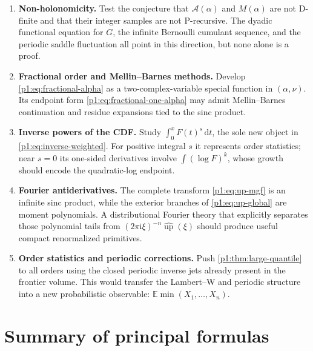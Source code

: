 \documentclass[11pt,oneside]{article}
\theoremstyle{definition}
\theoremstyle{remark}
\newcommand{\Up}{\operatorname{up}}
\newcommand{\E}{\mathbb E}
\newcommand{\dd}{\,\mathrm d}
\newcommand{\ii}{\mathrm i}
\newcommand{\1}{\mathbf 1}
\begin{document}
\begin{enumerate}
\item \textbf{Non-holonomicity.}  Test the conjecture that
\(\mathcal A(\alpha)\) and \(M(\alpha)\) are not D-finite and that their
integer samples are not P-recursive.  The dyadic functional equation for
\(G\), the infinite Bernoulli cumulant sequence, and the periodic saddle
fluctuation all point in this direction, but none alone is a proof.

\item \textbf{Fractional order and Mellin--Barnes methods.}  Develop
\eqref{p1:eq:fractional-alpha} as a two-complex-variable special function in
\((\alpha,\nu)\).  Its endpoint form \eqref{p1:eq:fractional-one-alpha} may admit
Mellin--Barnes continuation and residue expansions tied to the sinc product.

\item \textbf{Inverse powers of the CDF.}  Study
\(\int_0^xF(t)^s\dd t\), the sole new object in
\eqref{p1:eq:inverse-weighted}.  For positive integral \(s\) it represents order
statistics; near \(s=0\) its one-sided derivatives involve
\(\int(\log F)^k\), whose growth should encode the quadratic-log endpoint.

\item \textbf{Fourier antiderivatives.}  The complete transform
\eqref{p1:eq:up-mgf} is an infinite sinc product, while the exterior branches of
\eqref{p1:eq:up-global} are moment polynomials.  A distributional Fourier theory
that explicitly separates those polynomial tails from
\((2\pi\ii\xi)^{-n}\widehat{\Up}(\xi)\) should produce useful compact
renormalized primitives.

\item \textbf{Order statistics and periodic corrections.}  Push
\cref{p1:thm:large-quantile} to all orders using the closed periodic inverse jets
already present in the frontier volume.  This would transfer the Lambert--W
and periodic structure into a new probabilistic observable:
\(\E\min(X_1,\ldots,X_n)\).
\end{enumerate}

\section{Summary of principal formulas}
\end{document}
